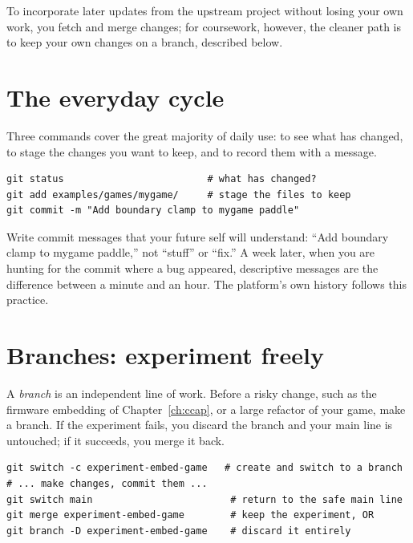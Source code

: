 To incorporate later updates from the upstream project without losing your own
work, you fetch and merge changes; for coursework, however, the cleaner path is to
keep your own changes on a branch, described below.

\section{The everyday cycle}

Three commands cover the great majority of daily use:  to see what has
changed,  to stage the changes you want to keep, and  to
record them with a message.

\begin{lstlisting}[style=bash,caption={The everyday Git cycle: inspect, stage, commit.}]
git status                         # what has changed?
git add examples/games/mygame/     # stage the files to keep
git commit -m "Add boundary clamp to mygame paddle"
\end{lstlisting}

\begin{prgwarn}
Write commit messages that your future self will understand: ``Add boundary clamp
to mygame paddle,'' not ``stuff'' or ``fix.'' A week later, when you are hunting for
the commit where a bug appeared, descriptive messages are the difference between a
minute and an hour. The platform's own history follows this practice.
\end{prgwarn}

\section{Branches: experiment freely}

A \emph{branch} is an independent line of work. Before a risky change, such as the
firmware embedding of Chapter~\ref{ch:ccap}, or a large refactor of your game, make
a branch. If the experiment fails, you discard the branch and your main line is
untouched; if it succeeds, you merge it back.

\begin{lstlisting}[style=bash,caption={Working on a branch, then merging or discarding.}]
git switch -c experiment-embed-game   # create and switch to a branch
# ... make changes, commit them ...
git switch main                        # return to the safe main line
git merge experiment-embed-game        # keep the experiment, OR
git branch -D experiment-embed-game    # discard it entirely
\end{lstlisting}

